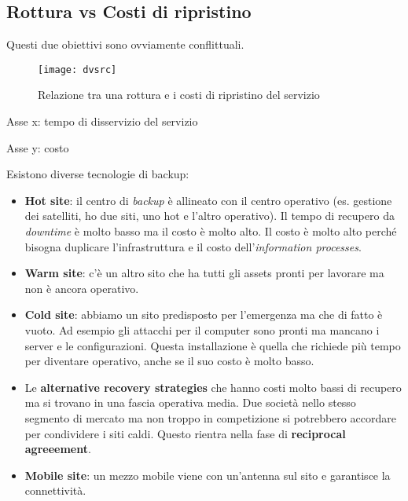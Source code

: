 \subsection{Rottura vs Costi di ripristino}

Questi due obiettivi sono ovviamente conflittuali.

\begin{figure}[H]
 \centering
 \texttt{[image: dvsrc]}
 \caption{Relazione tra una rottura e i costi di ripristino del servizio}
\end{figure}

Asse x: tempo di disservizio del servizio

Asse y: costo

Esistono diverse tecnologie di backup:
\begin{itemize}
  \item \textbf{Hot site}: il centro di \textit{backup} è allineato con il 
  centro operativo (es. gestione dei satelliti, ho due siti, uno hot e l'altro 
  operativo). Il tempo di recupero da \textit{downtime} è molto basso ma il 
  costo è molto alto. Il costo è molto alto perché bisogna duplicare 
  l'infrastruttura e il costo dell'\textit{information processes}.
  
  \item \textbf{Warm site}: c'è un altro sito che ha tutti gli assets pronti 
  per lavorare ma non è ancora operativo.
  
  \item \textbf{Cold site}: abbiamo un sito predisposto per l'emergenza ma che 
  di fatto è vuoto. Ad esempio gli attacchi per il computer sono pronti ma 
  mancano i server e le configurazioni. Questa installazione è quella che 
  richiede più tempo per diventare operativo, anche se il suo costo è molto 
  basso.
  
  \item Le \textbf{alternative recovery strategies} che hanno costi molto bassi 
  di recupero ma si trovano in una fascia operativa media. Due società nello 
  stesso segmento di mercato ma non troppo in competizione si potrebbero 
  accordare per condividere i siti caldi. Questo rientra nella fase di 
  \textbf{reciprocal agreeement}.
  
  
  \item \textbf{Mobile site}: un mezzo mobile viene con un'antenna sul sito e 
  garantisce la connettività.
  
\end{itemize}


